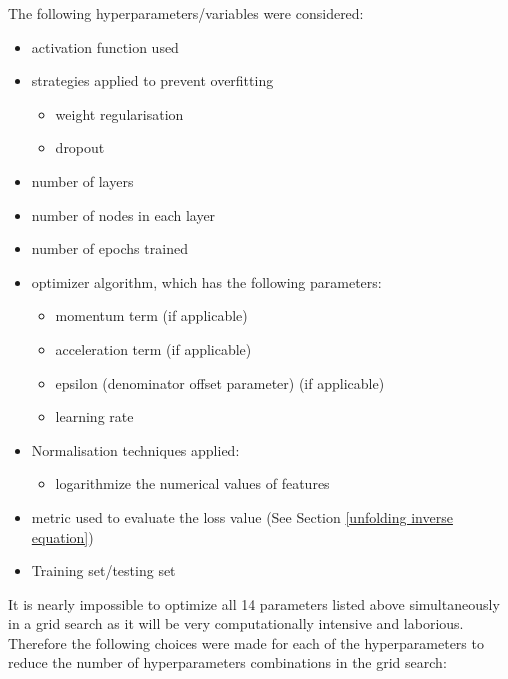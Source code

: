 \documentclass[a4paper, 12pt]{article}
\begin{document}
    The following hyperparameters/variables were considered:
\begin{itemize}
    \item activation function used
    \item strategies applied to prevent overfitting
    \begin{itemize}
        \item weight regularisation
        \item dropout
    \end{itemize}
    \item number of layers
    \item number of nodes in each layer
    \item number of epochs trained
    \item optimizer algorithm, which has the following parameters:
    \begin{itemize}
        \item momentum term (if applicable)
        \item acceleration term (if applicable)
        \item epsilon (denominator offset parameter) (if applicable)
        \item learning rate
    \end{itemize}
    \item Normalisation techniques applied:
    \begin{itemize}
        \item logarithmize the numerical values of features
    \end{itemize}
    \item metric used to evaluate the loss value (See Section \ref{unfolding inverse equation})
    \item Training set/testing set
\end{itemize}
    It is nearly impossible to optimize all 14 parameters listed above simultaneously in a grid search as it will be very computationally intensive and laborious. Therefore the following choices were made for each of the hyperparameters to reduce the number of hyperparameters combinations in the grid search:
\end{document}
